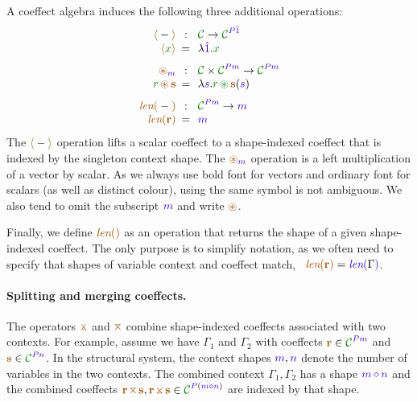 \noindent
A coeffect algebra induces the following three additional operations:
%
\begin{equation*}
\begin{array}{rclcrcl}
 \alift{-} &\narrow{:}& \C \rightarrow \C^{\SP \sunit}  \\
 \alift{\cclrd{x}} &\narrow{=}& \lambda \sunit . \cclrd{x}   \\
\\[-0.5em]
 \aseq_{\sclrd{m}} &\narrow{:}&  \C \times \C^{\SP \sclrd{m}} \rightarrow \C^{\SP \sclrd{m}}   \\
 \cclrd{r}\, \aseq\, \aclrd{\textbf{s}} &\narrow{=}& \lambda \sclrd{s} . \cclrd{r}\, \cseq\, \aclrd{\textbf{s}}(\sclrd{s}) \\
\\[-0.5em]
 \alen{-} &\narrow{:}& \C^{\SP \sclrd{m}} \rightarrow \sclrd{m}\\
 \alen{\aclrd{\textbf{r}}} &\narrow{=}& \sclrd{m}
\end{array}
\end{equation*}
%
The $\alift{-}$ operation lifts a scalar coeffect to a shape-indexed coeffect that is indexed by 
the singleton context shape. The $\aseq_{\sclrd{m}}$ operation is a left multiplication of a 
vector by scalar. As we always use bold font for vectors and ordinary font for scalars (as well 
as distinct colour), using the same symbol is not ambiguous. We also tend to omit the subscript
$\sclrd{m}$ and write $\aseq$. 

Finally, we define $\alen{}$ as an operation that returns the shape of a given shape-indexed 
coeffect. The only purpose is to simplify notation, as we often need to specify that shapes of 
variable context and coeffect match, \eg~$\alen{\aclrd{\textbf{r}}} = \slen{\Gamma}$.

\paragraph{Splitting and merging coeffects.}
The operators $\apar$ and $\azip$ combine shape-indexed coeffects associated with two contexts. 
For example, assume we have $\Gamma_1$ and $\Gamma_2$ with coeffects $\aclrd{\textbf{r}} \in 
\C^{\SP\sclrd{m}}$ and $\aclrd{\textbf{s}} \in \C^{\SP\sclrd{n}}$. In the structural system, the 
context shapes $\sclrd{m}, \sclrd{n}$ denote the number of variables in the two contexts. The 
combined context $\Gamma_1, \Gamma_2$ has a shape $\sclrd{m}\,\stimes\,\sclrd{n}$ and the combined 
coeffects $\aclrd{\textbf{r}} \,\azip\, \aclrd{\textbf{s}}, \aclrd{\textbf{r}} \,\apar\, \aclrd{\textbf{s}} 
\in \C^{\SP(\sclrd{m} \stimes \sclrd{n})}$ are indexed by that shape.

